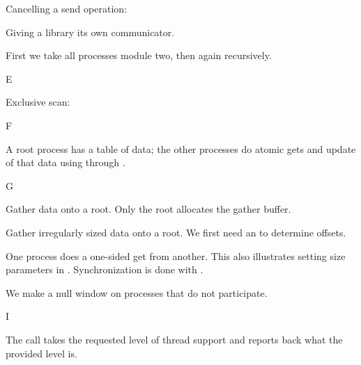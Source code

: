 Cancelling a send operation:





Giving a library its own communicator.



First we take all processes module two, then
again recursively.


 {E}


Exclusive scan:
%
%

 {F}


A root process has a table of data; the other processes do 
atomic gets and update of that data using  through .
%

 {G}


Gather data onto a root. Only the root allocates the gather buffer.


Gather irregularly sized data onto a root. We first need an
 to determine offsets.
%
%


One process does a one-sided get from another. This also illustrates
setting size parameters in
. Synchronization is done with
.
%

We make a null window on processes that do not participate.
%

 {I}


The  call takes the requested level of thread support
and reports back what the provided level is.
%

